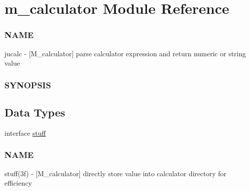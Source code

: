 \hypertarget{namespacem__calculator}{}\section{m\+\_\+calculator Module Reference}
\label{namespacem__calculator}


\subsubsection*{N\+A\+ME}

jucalc -\/ \mbox{[}M\+\_\+calculator\mbox{]} parse calculator expression and return numeric or string value \subsubsection*{S\+Y\+N\+O\+P\+S\+IS} 


\subsection*{Data Types}
\begin{DoxyCompactItemize}
\item 
interface \hyperlink{interfacem__calculator_1_1stuff}{stuff}
\begin{DoxyCompactList}\small\item\em \subsubsection*{N\+A\+ME}

stuff(3f) -\/ \mbox{[}M\+\_\+calculator\mbox{]} directly store value into calculator directory for efficiency \end{DoxyCompactList}\end{DoxyCompactItemize}
